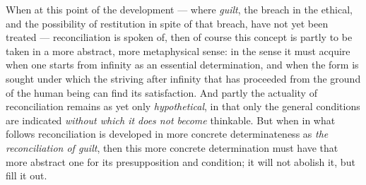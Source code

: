 \documentclass[12pt,a4paper]{book}
\begin{document}
When at this point of the development --- where \emph{guilt}, the breach in the
ethical, and the possibility of restitution in spite of that breach, have not
yet been treated --- reconciliation is spoken of, then of course this concept
is partly to be taken in a more abstract, more metaphysical sense: in the
sense it must acquire when one starts from infinity as an essential
determination, and when the form is sought under which the striving after
infinity that has proceeded from the ground of the human being can find its
satisfaction. And partly the actuality of reconciliation remains as yet only
\emph{hypothetical}, in that only the general conditions are indicated
\emph{without which it does not become} thinkable. But when in what follows
reconciliation is developed in more concrete determinateness as \emph{the
reconciliation of guilt},
then this more concrete determination must have that more abstract one for its
presupposition and condition; it will not abolish it, but fill it out.
\end{document}
